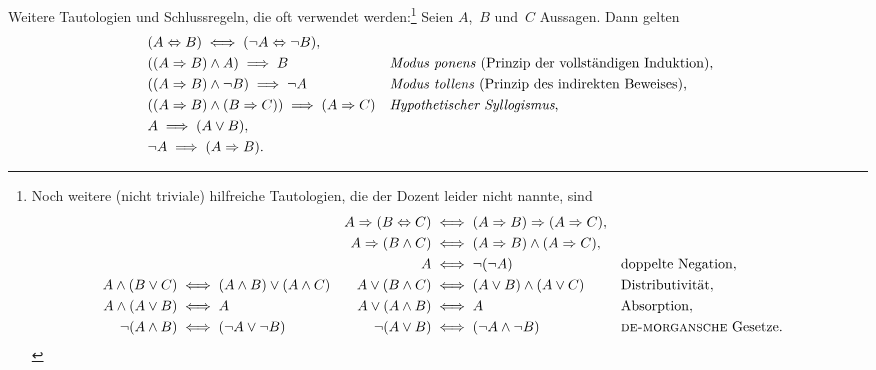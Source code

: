 \documentclass[a4paper]{article}
\begin{document}
\begin{theorem}\label{thm:logiclaws}
    Weitere Tautologien und Schlussregeln, die oft verwendet werden:\footnote{
        Noch weitere (nicht triviale) hilfreiche Tautologien, die der Dozent leider nicht nannte, sind
        \begin{align*}
                                &                                     & A \Rightarrow (B \Leftrightarrow C) & \iff (A \Rightarrow B) \Rightarrow (A \Rightarrow C),                                            \\
                                &                                     & A \Rightarrow (B \wedge C)          & \iff (A \Rightarrow B) \wedge (A \Rightarrow C),                                                 \\
                                &                                     & A                                   & \iff \neg (\neg A)                                   &  & \text{doppelte Negation},              \\
            A \wedge (B \vee C) & \iff (A \wedge B) \vee (A \wedge C) & A \vee (B \wedge C)                 & \iff (A \vee B) \wedge (A \vee C)                    &  & \text{Distributivität},                \\
            A \wedge (A \vee B) & \iff A                              & A \vee (A \wedge B)                 & \iff A                                               &  & \text{Absorption},                     \\
            \neg (A \wedge B)   & \iff (\neg A \vee \neg B)           & \neg (A \vee B)                     & \iff (\neg A \wedge \neg B)                          &  & \text{\textsc{de-morgansche} Gesetze}. \\
        \end{align*}
    } Seien $A$,~$B$ und~$C$ Aussagen. Dann gelten
    \begin{align*}
         & (A \Leftrightarrow B) \iff (\neg A \Leftrightarrow \neg B),                                                                                    \\
         & ((A \Rightarrow B) \wedge A) \implies B                                 &  & \text{\emph{Modus ponens} (Prinzip der vollständigen Induktion),} \\
         & ((A \Rightarrow B) \wedge \neg B) \implies \neg A                       &  & \text{\emph{Modus tollens} (Prinzip des indirekten Beweises),}    \\
         & ((A \Rightarrow B) \wedge (B \Rightarrow C)) \implies (A \Rightarrow C) &  & \text{\emph{Hypothetischer Syllogismus},}                         \\
         & A \implies (A \vee B),                                                                                                                         \\
         & \neg A \implies (A \Rightarrow B).
    \end{align*}
\end{theorem}
\end{document}
